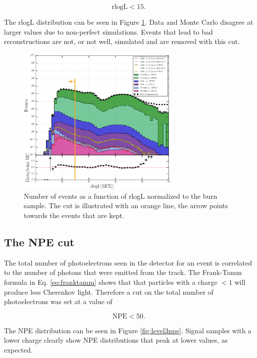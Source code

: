 \begin{equation}
\textrm{rlogL} < 15.
\end{equation}

The rlogL distribution can be seen in Figure \ref{fig:level3cutsrlogl}. Data and Monte Carlo disagree at larger values due to non-perfect simulations. Events that lead to bad reconstructions are not, or not well, simulated and are removed with this cut.


\begin{figure}[t]
\centering
\includegraphics[width=0.7\textwidth]{chapter8/img/1D_stack_mpefit_rlogl_new.png}
\caption{Number of events as a function of rlogL normalized to the burn sample. The cut is illustrated with an orange line, the arrow points towards the events that are kept.}
\label{fig:level3cutsrlogl}
\end{figure}


\subsection{The NPE cut}
The total number of photoelectrons seen in the detector for an event is correlated to the number of photons that were emitted from the track. The Frank-Tamm formula in Eq. \ref{eq:franktamm} shows that that particles with a charge $< 1$ will produce less Cherenkov light. Therefore a cut on the total number of photoelectrons was set at a value of 

\begin{equation}
\textrm{NPE} < 50.
\end{equation} 

The NPE distribution can be seen in Figure \ref{fig:level3npe}. Signal samples with a lower charge clearly show NPE distributions that peak at lower values, as  expected. 


